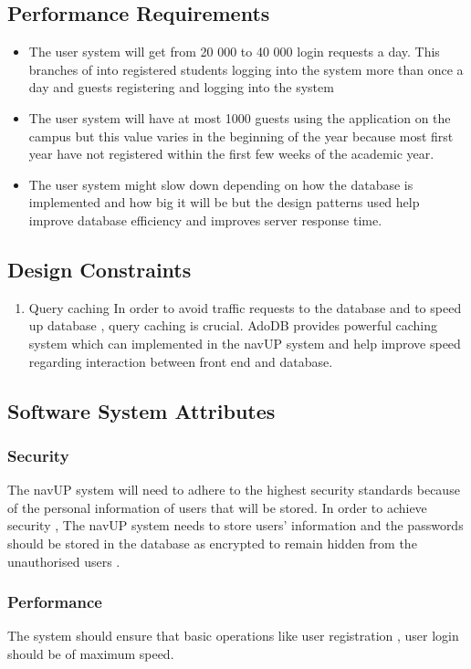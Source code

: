 \subsection{Performance Requirements}
\begin{itemize}
	\item The user system will get from 20 000 to 40 000 login requests a day. This branches of into registered students logging into the system more than once a day and guests registering and logging into the system
	\item The user system will have at most 1000 guests using the application on the campus but this value varies in the beginning of the year because most first year have not registered within the first few weeks of the academic year. 
        \item The user system might slow down depending on how the database is implemented and how big it will be but the design patterns used help improve database efficiency and improves server response time.
\end{itemize}
\subsection{Design Constraints}
\begin{enumerate}
	\item Query caching
	\newline
	In order to avoid traffic requests to the database and to speed up database , query caching is crucial. AdoDB provides powerful caching system which can implemented in the navUP system and help improve speed regarding interaction between front end and database.
\end{enumerate}
\subsection{Software System Attributes}

	\subsubsection{Security}
	The navUP system will need to adhere to the highest security standards because of the personal information of users that will be stored. In order to achieve security , The navUP system needs to store users’ information and the passwords should be stored in the database as encrypted to remain hidden from the unauthorised users  .
	\subsubsection{Performance}
	The system should ensure that basic operations like user registration , user login should be of maximum speed. 
